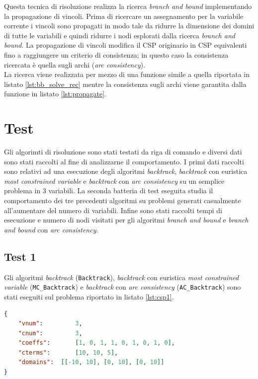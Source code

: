 \documentclass[10pt, a4paper]{article}
\begin{document}
Questa tecnica di risoluzione realizza la ricerca \textit{branch and bound} implementando la propagazione di vincoli. Prima di ricercare un assegnamento per la variabile corrente i vincoli sono propagati in modo tale da ridurre la dimensione dei domini di tutte le variabili e quindi ridurre i nodi esplorati dalla ricerca \textit{branch and bound}. La propagazione di vincoli modifica il CSP originario in CSP equivalenti fino a raggiungere un criterio di consistenza; in questo caso la consistenza ricercata è quella sugli archi (\textit{arc consistency}).\\
La ricerca viene realizzata per mezzo di una funzione simile a quella riportata in listato \ref{lst:bb_solve_rec} mentre la consistenza sugli archi viene garantita dalla funzione in listato \ref{lst:propagate}.


\section{Test}

Gli algorimti di risoluzione sono stati testati da riga di comando e diversi dati sono stati raccolti al fine di analizzarne il comportamento. I primi dati raccolti sono relativi ad una esecuzione degli algoritmi \textit{backtrack}, \textit{backtrack} con euristica \textit{most constrained variable} e \textit{backtrack} con \textit{arc consistency} su un semplice problema in 3 variabili. La seconda batteria di test eseguita studia il comportamento dei tre precedenti algoritmi su problemi generati casualmente all'aumentare del numero di variabili. Infine sono stati raccolti tempi di esecuzione e numero di nodi visitati per gli algoritmi \textit{branch and bound} e \textit{branch and bound} con \textit{arc consistency}.

\subsection{Test 1}
Gli algoritmi \textit{backtrack} (\texttt{Backtrack}), \textit{backtrack} con euristica \textit{most constrained variable} (\texttt{MC\_Backtrack}) e \textit{backtrack} con \textit{arc consistency} (\texttt{AC\_Backtrack}) sono stati eseguiti sul problema riportato in listato \ref{lst:csp1}.

\begin{lstlisting}[language=json, caption=csp1: problema sul quale è stata eseguita la prima batteria di test, label=lst:csp1]
{
	"vnum": 		3,
	"cnum":			3,
	"coeffs":		[1, 0, 1, 1, 0, 1, 0, 1, 0],
	"cterms":		[10, 10, 5],
	"domains":	[[-10, 10], [0, 10], [0, 10]]
}
\end{lstlisting}
\end{document}
